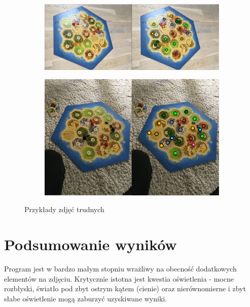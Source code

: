 \documentclass[a4paper]{article}
\begin{document}
    \begin{figure}[H]
        \begin{subfigure}[]{\linewidth}
            \includegraphics[width=\linewidth]{pictures/hard1.png}
        \end{subfigure}
        
        \begin{subfigure}[]{\linewidth}
            \includegraphics[width=\linewidth]{pictures/results/result03.png}
        \end{subfigure}

        \caption{Przykłady zdjęć trudnych}
        \label{fig:hard}
    \end{figure}
    
\section{Podsumowanie wyników}
	Program jest w bardzo małym stopniu wrażliwy na obecność dodatkowych elementów na zdjęciu. Krytycznie istotna jest kwestia oświetlenia - mocne rozbłyski, światło pod zbyt ostrym kątem (cienie) oraz nierównomierne i zbyt słabe oświetlenie mogą zaburzyć uzyskiwane wyniki. 
	
\end{document}
